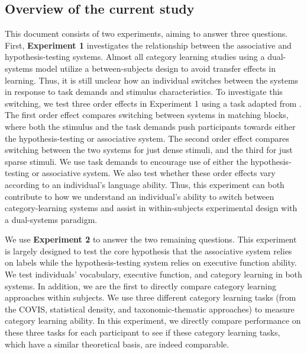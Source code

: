 \documentclass[../dissertation.tex]{subfiles}
\begin{document}
\subsection{Overview of the current study}
	This document consists of two experiments, aiming to answer three questions. First, \textbf{Experiment 1} investigates the relationship between the associative and hypothesis-testing systems. Almost all category learning studies using a dual-systems model utilize a between-subjects design to avoid transfer effects in learning. Thus, it is still unclear how an individual switches between the systems in response to task demands and stimulus characteristics. To investigate this switching, we test three order effects in Experiment 1 using a task adapted from \citet{Kloos2008}. The first order effect compares switching between systems in matching blocks, where both the stimulus and the task demands push participants towards either the hypothesis-testing or associative system. The second order effect compares switching between the two systems for just dense stimuli, and the third for just sparse stimuli. We use task demands to encourage use of either the hypothesis-testing or associative system. We also test whether these order effects vary according to an individual's language ability. Thus, this experiment can both contribute to how we understand an individual's ability to switch between category-learning systems and assist in within-subjects experimental design with a dual-systems paradigm. \par
	We use \textbf{Experiment 2} to answer the two remaining questions. This experiment is largely designed to test the core hypothesis that the associative system relies on labels while the hypothesis-testing system relies on executive function ability. We test individuals' vocabulary, executive function, and category learning in both systems. In addition, we are the first to directly compare category learning approaches within subjects. We use three different category learning tasks (from the COVIS, statistical density, and taxonomic-thematic approaches) to measure category learning ability. In this experiment, we directly compare performance on these three tasks for each participant to see if these category learning tasks, which have a similar theoretical basis, are indeed comparable.
\end{document}
